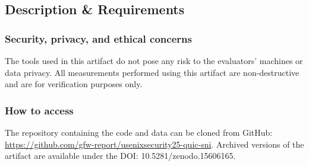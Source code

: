 \subsection{Description \& Requirements}


\subsubsection{Security, privacy, and ethical concerns}
The tools used in this artifact do not pose any risk to the evaluators' machines
or data privacy. All measurements performed using this artifact are non-destructive and
are for verification purposes only.


\subsubsection{How to access}
The repository containing the code and data can be cloned from GitHub:\@
\url{https://github.com/gfw-report/usenixsecurity25-quic-sni}. Archived versions
of the artifact are available under the DOI: 10.5281/zenodo.15606165.

